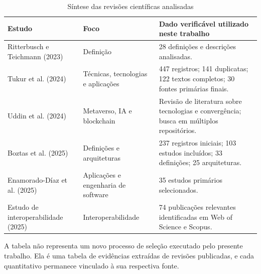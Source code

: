 \begin{table}[H]
\centering
\caption{Síntese das revisões científicas analisadas}
\label{tab:revisoes}
\begin{tabular}{p{}p{}p{}}
\toprule
\textbf{Estudo} & \textbf{Foco} & \textbf{Dado verificável utilizado neste trabalho}\\
\midrule
Ritterbusch e Teichmann (2023) & Definição & 28 definições e descrições analisadas.\\
Tukur et al. (2024) & Técnicas, tecnologias e aplicações & 447 registros; 141 duplicatas; 122 textos completos; 30 fontes primárias finais.\\
Uddin et al. (2024) & Metaverso, IA e blockchain & Revisão de literatura sobre tecnologias e convergência; busca em múltiplos repositórios.\\
Boztas et al. (2025) & Definições e arquiteturas & 237 registros iniciais; 103 estudos incluídos; 33 definições; 25 arquiteturas.\\
Enamorado-Díaz et al. (2025) & Aplicações e engenharia de software & 35 estudos primários selecionados.\\
Estudo de interoperabilidade (2025) & Interoperabilidade & 74 publicações relevantes identificadas em Web of Science e Scopus.\\
\bottomrule
\end{tabular}
\end{table}

A tabela não representa um novo processo de seleção executado pelo presente trabalho. Ela é uma tabela de evidências extraídas de revisões publicadas, e cada quantitativo permanece vinculado à sua respectiva fonte.
